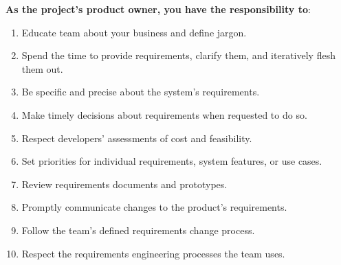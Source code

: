 {\bfseries As the project's product owner, you have the responsibility to}:
\begin{enumerate}
    \item Educate team about your business and define jargon.
    \item Spend the time to provide requirements, clarify them, and iteratively
          flesh them out.
    \item Be specific and precise about the system's requirements.
    \item Make timely decisions about requirements when requested to do so.
    \item Respect developers' assessments of cost and feasibility.
    \item Set priorities for individual requirements, system features, or use
          cases.
    \item Review requirements documents and prototypes.
    \item Promptly communicate changes to the product's requirements.
    \item Follow the team's defined requirements change process.
    \item Respect the requirements engineering processes the team uses.
\end{enumerate}